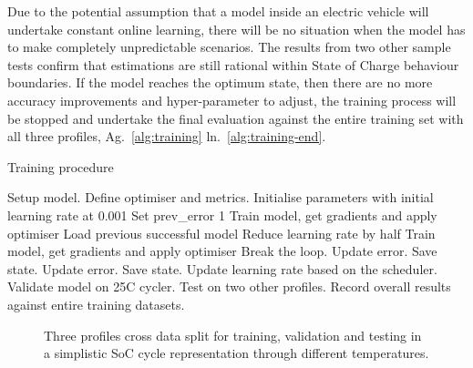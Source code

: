 Due to the potential assumption that a model inside an electric vehicle will undertake constant online learning, there will be no situation when the model has to make completely unpredictable scenarios.
The results from two other sample tests confirm that estimations are still rational within State of Charge behaviour boundaries.
If the model reaches the optimum state, then there are no more accuracy improvements and hyper-parameter to adjust, the training process will be stopped and undertake the final evaluation against the entire training set with all three profiles, Ag.~\ref{alg:training} ln.~\ref{alg:training-end}.
\begin{algorithm}
    \caption{Training procedure}
        \begin{algorithmic}[1]
            \STATE Setup model. Define optimiser and metrics.
            \STATE Initialise parameters with initial learning rate at 0.001
            \STATE Set prev\_error 1
                \STATE Train model, get gradients and apply optimiser
                    \label{alg:training-check}
                        \STATE Load previous successful model   \label{alg:training-recovery-start}
                        \STATE Reduce learning rate by half
                        \STATE Train model, get gradients and apply optimiser
                            \STATE Break the loop. Update error. Save state. \label{alg:training-recovery-end}
                        \ENDIF
                    \ENDWHILE
                \ELSE
                    \STATE Update error. Save state. \label{alg:training-succes}
                    \STATE Update learning rate based on the scheduler.
                \ENDIF
                \STATE Validate model on 25\textdegree{}C cycler.   \label{alg:training-valid}
                \STATE Test on two other profiles. \label{alg:training-test}
            \ENDWHILE
            \STATE Record overall results against entire training datasets. \label{alg:training-end}
        \end{algorithmic}
    \label{alg:training}
\end{algorithm}
\begin{figure}[ht]
    \centering
    
    \caption{Three profiles cross data split for training, validation and testing in a simplistic SoC cycle representation through different temperatures.}
    \label{fig:cross-data}
\end{figure}

